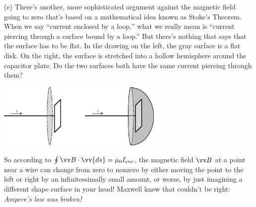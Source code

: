 (e)  There's another, more sophisticated argument against the magnetic field going to zero that's based on a mathematical idea known as Stoke's Theorem.  When we say ``current enclosed by a loop,'' what we really mean is ``current piercing through a surface bound by a loop.'' But there's nothing that says that the surface has to be flat.  In the drawing on the left, the gray surface is a flat disk.  On the right, the surface is stretched into a hollow hemisphere around the capacitor plate.  Do the two surfaces both have the same current piercing through them?
\begin{center}
\vspace{-0.1in}
    \includegraphics[width=0.6\textwidth]{deriving_em_waves/two_surfaces.eps}
\vspace{-0.1in}
\end{center}

So according to $\oint \vv B \cdot \vv{ds} = \mu_0I_{enc}$, the magnetic field $\vv B$ at a point near a wire can change from zero to nonzero by either moving the point to the left or right by an infinitessimally small amount, or worse, by just imagining a different shape surface in your head!  Maxwell knew that couldn't be right: \textit{Ampere's law was broken!}

